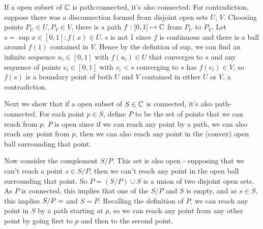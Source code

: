 \documentclass{homework}
\begin{document}
                                                          \begin{solution}
                                                          If a open subset of $\mathbb{C}$ is path-connected, it's also connected: For contradiction, suppose there was a disconnection formed from disjoint open sets $U$, $V$. Choosing points $P_U \in U, P_V \in V$, there is a path $f:[0, 1]\mapsto \mathbb{C}$ from $P_U$ to $P_V$. Let $s = \sup x\in [0,1]: f(x) \in U$. s is not 1 since $f$ is continuous and there is a ball around $f(1)$ contained in $V$. Hence by the defintion of sup, we can find an infinite sequence $u_i \in [0, 1]$ with $f(u_i) \in U$ that converges to $s$ and any sequence of points $v_i \in [0, 1]$ with $v_i < s$ converging to $s$ has $f(v_i) \in V$, so $f(s)$ is a boundary point of both $U$ and $V$ contained in either $U$ or $V$, a contradiction.

                                                          Next we show that if a open subset of $S\in \mathbb{C}$ is connected, it's also path-connected. For each point $p \in S$, define $P$ to be the set of points that we can reach from $p$. $P$ is open since if we can reach any point by a path, we can also reach any point from $p$, then we can also reach any point in the (convex) open ball surrounding that point.

                                                          Now consider the complement $S/P$. This set is also open - supposing that we can't reach a point $s\in S/P$, then we can't reach any point in the open ball surrounding that point. So $P=(S/P)\cup S$ is a union of two disjoint open sets. As $P$ is connected, this implies that one of the $S/P$ and $S$ is empty, and as $s\in S$, this implies $S/P = \empty$ and $S=P$. Recalling the definition of $P$, we can reach any point in $S$ by a path starting at $p$, so we can reach any point from any other point by going first to $p$ and then to the second point.
                                                          \end{solution}
\end{document}
